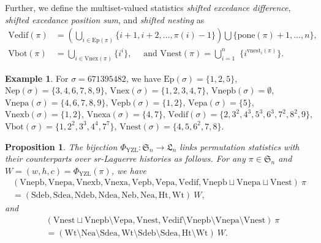 \documentclass[12pt]{amsart}
\numberwithin{equation}{section}
\theoremstyle{plain}
\newtheorem{proposition}[theorem]{Proposition}
\theoremstyle{definition}
\newtheorem{example}[theorem]{Example}
\def\YZL{\mathrm{YZL}}
\def\SS{\mathfrak{S}}
\def\LH{\mathfrak{L}}
\def\Neb{\mathrm{Neb}}
\def\Nea{\mathrm{Nea}}
\def\Sdeb{\mathrm{Sdeb}}
\def\Sdea{\mathrm{Sdea}}
\def\Ndeb{\mathrm{Ndeb}}
\def\Ndea{\mathrm{Ndea}}
\def\Het{\mathrm{Ht}}
\def\Wt{\mathrm{Wt}}
\def\Excp{\mathrm{Ep}}
\def\Nexcp{\mathrm{Nep}}
\def\Vnexpb{\mathrm{Vnepb}}
\def\Vnexpa{\mathrm{Vnepa}}
\def\Vnexb{\mathrm{Vnexb}}
\def\Vnexa{\mathrm{Vnexa}}
\def\Vexpb{\mathrm{Vepb}}
\def\Vexpa{\mathrm{Vepa}}
\def\Vedif{\mathrm{Vedif}}
\def\Vbot{\mathrm{Vbot}}
\def\Vnex{\mathrm{Vnex}}
\def\Vnest{\mathrm{Vnest}}
\def\pone{\mathrm{pone}}
\def\vnest{\mathrm{vnest}}
\begin{document}
Further, we define the multiset-valued statistics
{\em shifted excedance difference}, {\em shifted excedance position sum}, and {\em shifted nesting} as
\begin{align*}
\Vedif(\pi) &=\left(\bigcup_{i \in \Excp(\pi)}\{i+1,i+2, \ldots, \pi(i)-1\} \right) \bigcup \{\pone(\pi)+1,\ldots,n\},\\[3pt]
\Vbot(\pi) &=\bigcup_{i \in \Vnex(\pi)}\{i^{i}\},\,\,\,\,\,\,\,\,\text{and }
\Vnest(\pi)=\bigcup_{i=1}^n \,\,\{i^{\vnest_i(\pi)}\}.
\end{align*}




\begin{example}
For $\sigma=671395482$, we have
$\Excp(\sigma)=\{1,2,5\}$,
$\Nexcp(\sigma)=\{3,4,6,7,8,9\}$,
$\Vnex(\sigma)=\{1,2,3,4,7\}$,
$\Vnexpb(\sigma)=\emptyset$, $\Vnexpa(\sigma)=\{4,6,7,8,9\}$,
$\Vexpb(\sigma)=\{1,2\}$, $\Vexpa(\sigma)=\{5\}$,
$\Vnexb(\sigma)=\{1,2\}$,
$\Vnexa(\sigma)=\{4,7\}$,
$\Vedif(\sigma)=\{2,3^2,4^3,5^3,6^3,7^2,8^2,9\}$,
$\Vbot(\sigma)=\{1,2^2,3^3,4^4,7^7\}$,
$\Vnest(\sigma)=\{4,5,6^2,7,8\}$.
\end{example}


\begin{proposition}\label{prop:YZL}
The bijection $\Phi_{\YZL}:\SS_n\rightarrow \LH_n$  links  permutation statistics with their counterparts over sr-Laguerre histories as follows. For any $\pi\in\SS_n$ and $W=(w,h,c)=\Phi_{\YZL}(\pi)$,
 we have
\begin{align}
\label{eq:YZLSET}
(\Vnexpb,\Vnexpa,\Vnexb,\Vnexa,\Vexpb,\Vexpa,\Vedif,\Vnexpb\sqcup\Vnexpa\sqcup\Vnest)\:\pi \\[3pt]
= (\Sdeb,\Sdea,\Ndeb,\Ndea,\Neb,\Nea, \Het,\Wt)\:W,  \nonumber
\end{align}
and
\begin{align}
&(\Vnest\sqcup \Vnexpb \setminus \Vexpa, \Vnest,
\Vedif\setminus\Vnexpb\setminus\Vnexpa\setminus\Vnest)\:\pi \\
&= ( \Wt\setminus\Nea\setminus\Sdea,
\Wt\setminus\Sdeb\setminus\Sdea,\Het\setminus\Wt)\:W. \nonumber
\end{align}
\end{proposition}
\end{document}
